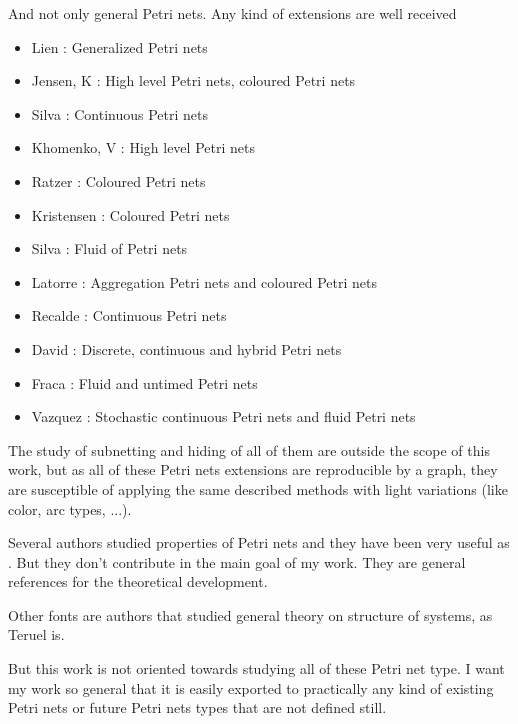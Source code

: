 And not only general Petri nets. Any kind of extensions are well received
\begin{itemize}
\item Lien \cite{EPN-Lien1976251}: Generalized Petri nets
\item Jensen, K \cite{G-EPN-Jensen1985723,EPN-SM-Jensen2007213,EPN-Jensen2009}: High level
Petri nets, coloured Petri nets
\item Silva \cite{EPN-PROP-Silva2002314,EPN-SM-Silva2011427}: Continuous Petri nets 
\item Khomenko, V \cite{G-SM-Khomenko2003458}: High level Petri nets
\item Ratzer \cite{EPN-PROP-Ratzer2003450}: Coloured Petri nets
\item Kristensen \cite{EPN-Kristensen2004626,EPN-SM-Kristensen200819}: Coloured Petri nets
\item Silva \cite{EPN-Silva2004253}: Fluid of Petri nets
\item Latorre \cite{EPN-SM-Latorre2010152,EPN-SM-Latorre2010247}: Aggregation Petri nets and coloured Petri nets
\item Recalde \cite{EPN-Recalde2010235}: Continuous Petri nets
\item David \cite{EPN-David2010}: Discrete, continuous and hybrid Petri nets
\item Fraca \cite{EPN-Fraca201221}: Fluid and untimed Petri nets
\item Vazquez \cite{EPN-Vazquez2012641,EPN-Vazquez2013365}: Stochastic continuous
Petri nets and fluid Petri nets
\end{itemize}

The study of
subnetting and hiding of all of them are outside the scope of this work,
but as all of these Petri nets extensions are reproducible by a graph, they are
susceptible of applying the same described methods with light variations
(like color, arc types, ...). 

 
Several authors studied properties of Petri nets and they have been very
useful as \cite{PROP-Murata1977412,PROP-Engelfriet1991575,PROP-Silva1992447,PROP-Recalde1998223,PROP-Zeng20021308}.
But they don't contribute in the main goal of my work. They are general references
for the theoretical development. 
 
Other fonts are authors that studied general theory on structure of systems, as Teruel \cite{G-Teruel1996271} is. 

But this work is not oriented towards studying all of these Petri net type.
I want my work so general that it is easily exported to practically any kind
of existing Petri nets or future Petri nets types that are not defined still.


